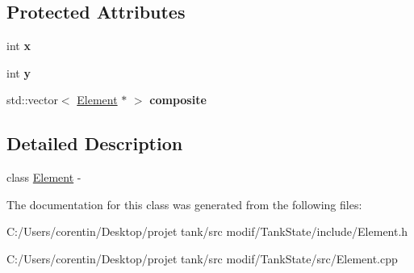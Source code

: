 \subsection*{Protected Attributes}
\begin{DoxyCompactItemize}
\item 
\mbox{\label{classstate_1_1_element_aae18fab1d563f154f64760cf6b9d96c4}} 
int {\bfseries x}
\item 
\mbox{\label{classstate_1_1_element_a726a92bb1fa8a574359760c16febd212}} 
int {\bfseries y}
\item 
\mbox{\label{classstate_1_1_element_a4fc0e453f7f839ef07e57ee9a95ee62c}} 
std\+::vector$<$ \hyperlink{classstate_1_1_element}{Element} $\ast$ $>$ {\bfseries composite}
\end{DoxyCompactItemize}


\subsection{Detailed Description}
class \hyperlink{classstate_1_1_element}{Element} -\/ 

The documentation for this class was generated from the following files\+:\begin{DoxyCompactItemize}
\item 
C\+:/\+Users/corentin/\+Desktop/projet tank/src modif/\+Tank\+State/include/Element.\+h\item 
C\+:/\+Users/corentin/\+Desktop/projet tank/src modif/\+Tank\+State/src/Element.\+cpp\end{DoxyCompactItemize}
